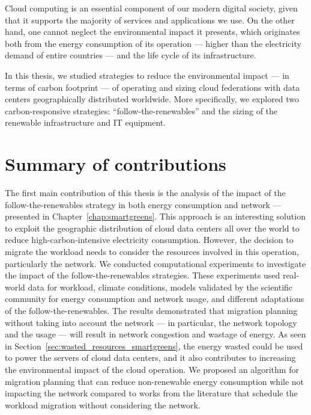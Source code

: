 Cloud computing is an essential component of our modern digital society, given that it supports the majority of services and applications we use. On the other hand, one cannot neglect the environmental impact it presents, which originates both from the energy consumption of its operation --- higher than the electricity demand of entire countries --- and the life cycle of its infrastructure.


In this thesis, we studied strategies to reduce the environmental impact --- in terms of carbon footprint --- of operating and sizing cloud federations with data centers geographically distributed worldwide. More specifically, we explored two carbon-responsive strategies: ``follow-the-renewables'' and the sizing of the renewable infrastructure and IT equipment.


\section{Summary of contributions }

\label{sec:conclusion_summary}

The first main contribution of this thesis is the analysis of the impact of the follow-the-renewables strategy in both energy consumption and network --- presented in Chapter~\ref{chap:smartgreens}. This approach is an interesting solution to exploit the geographic distribution of cloud data centers all over the world to reduce high-carbon-intensive electricity consumption. However, the decision to migrate the workload needs to consider the resources involved in this operation, particularly the network. We conducted computational experiments to investigate the impact of the follow-the-renewables strategies. These experiments used real-world data for workload, climate conditions, models validated by the scientific community for energy consumption and network usage, and different adaptations of the follow-the-renewables. The results demonstrated that migration planning without taking into account the network --- in particular, the network topology and the usage --- will result in network congestion and wastage of energy. As seen in Section~\ref{sec:wasted_resources_smartgreens}, the energy wasted could be used to power the servers of cloud data centers, and it also contributes to increasing the environmental impact of the cloud operation. We proposed an algorithm for migration planning that can reduce non-renewable energy consumption while not impacting the network compared to works from the literature that schedule the workload migration without considering the network.


